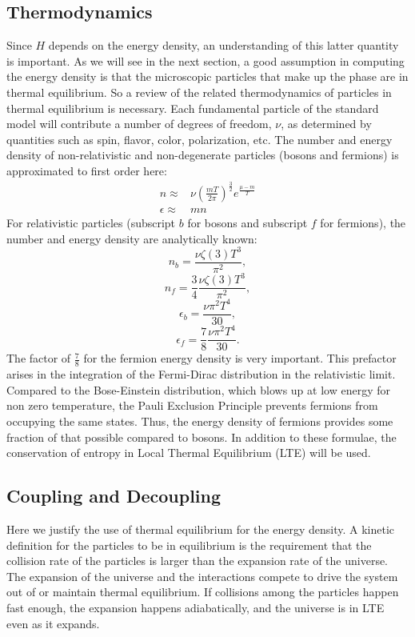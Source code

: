 \documentclass[12pt]{article}
\theoremstyle{plain}
\theoremstyle{definition}
\begin{document}
\subsection{Thermodynamics}
\hspace{0.2in} Since $H$ depends on the energy density, an understanding of this latter quantity is important. As we will see in the next section, a good assumption in computing the energy density is that the microscopic particles that make up the phase are in thermal equilibrium. So a review of the related thermodynamics of particles in thermal equilibrium is necessary. Each fundamental particle of the standard model will contribute a number of degrees of freedom, $\nu$, as determined by quantities such as spin, flavor, color, polarization, etc. The number and energy density of non-relativistic and non-degenerate particles (bosons and fermions) is approximated to first order here: 
\begin{align*}
n\approx&\nu\left(\frac{mT}{2\pi}\right)^{\frac{3}{2}}e^{\frac{\mu-m}{T}}   \\ \epsilon\approx& mn 
\end{align*}
For relativistic particles (subscript $b$ for bosons and subscript $f$ for fermions), the number and energy density are analytically known:\begin{equation}
n_b=\frac{\nu\zeta(3){T}^3}{{\pi}^2},
\end{equation}
\begin{equation}
n_f=\frac{3}{4}\frac{\nu\zeta(3){T}^3}{{\pi}^2},
\end{equation}
\begin{equation}
\epsilon_b=\frac{\nu{\pi}^2{T}^4}{30},
\end{equation}
\begin{equation}
\epsilon_f=\frac{7}{8}\frac{\nu{\pi}^2{T}^4}{30}.
\end{equation}
The factor of $\frac{7}{8}$ for the fermion energy density is very important. This prefactor arises in the integration of the Fermi-Dirac distribution in the relativistic limit. Compared to the Bose-Einstein distribution, which blows up at low energy for non zero temperature, the Pauli Exclusion Principle prevents fermions from occupying the same states. Thus, the energy density of fermions provides some fraction of that possible compared to bosons. In addition to these formulae, the conservation of entropy in Local Thermal Equilibrium (LTE) will be used.
\subsection{Coupling and Decoupling}
\hspace{0.2in} Here we justify the use of thermal equilibrium for the energy density.  A kinetic definition for the particles to be in equilibrium is the requirement that the collision rate of the particles is larger than the expansion rate of the universe. The expansion of the universe and the interactions compete to drive the system out of or maintain thermal equilibrium. If collisions among the particles happen fast enough, the expansion happens adiabatically, and the universe is in LTE even as it expands. 
\end{document}
